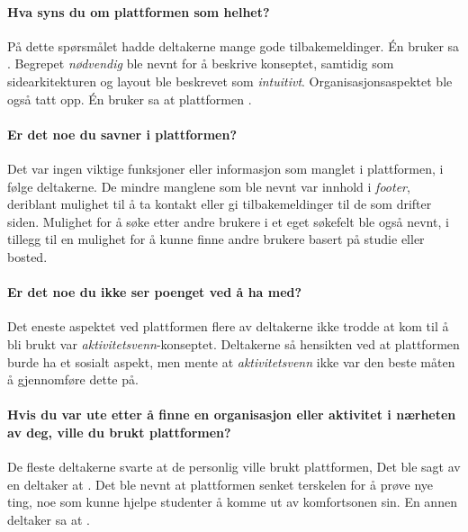 \paragraph{Hva syns du om plattformen som helhet?}
På dette spørsmålet hadde deltakerne mange gode tilbakemeldinger. Én bruker sa . Begrepet {\em nødvendig} ble nevnt for å beskrive konseptet, samtidig som sidearkitekturen og layout ble beskrevet som {\em intuitivt}. Organisasjonsaspektet ble også tatt opp. Én bruker sa at plattformen .

\paragraph{Er det noe du savner i plattformen?}
Det var ingen viktige funksjoner eller informasjon som manglet i plattformen, i følge deltakerne. De mindre manglene som ble nevnt var innhold i {\em footer}, deriblant mulighet til å ta kontakt eller gi tilbakemeldinger til de som drifter siden. Mulighet for å søke etter andre brukere i et eget søkefelt ble også nevnt, i tillegg til en mulighet for å kunne finne andre brukere basert på studie eller bosted.

\paragraph{Er det noe du ikke ser poenget ved å ha med?}
Det eneste aspektet ved plattformen flere av deltakerne ikke trodde at kom til å bli brukt var {\em aktivitetsvenn}-konseptet. Deltakerne så hensikten ved at plattformen burde ha et sosialt aspekt, men mente at {\em aktivitetsvenn} ikke var den beste måten å gjennomføre dette på.

\paragraph{Hvis du var ute etter å finne en organisasjon eller aktivitet i nærheten av deg, ville du brukt plattformen?}
De fleste deltakerne svarte at de personlig ville brukt plattformen, Det ble sagt av en deltaker at . Det ble nevnt at plattformen senket terskelen for å prøve nye ting, noe som kunne hjelpe studenter å komme ut av komfortsonen sin. En annen deltaker sa at .

